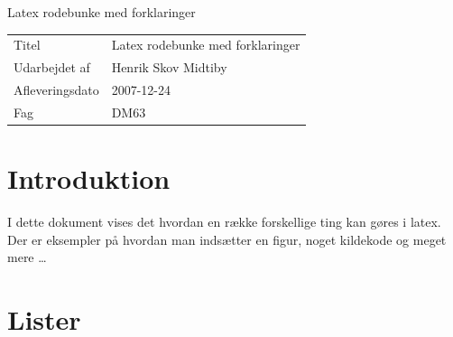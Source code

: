 \documentclass[11pt,a4paper,fleqn]{article}
\title{\titel}
\author{}
\date{}
\numberwithin{equation}{section}
\newcommand{\forfattere}{Henrik Skov Midtiby}
\newcommand{\titel}{Latex rodebunke med forklaringer}
\newcommand{\dato}{2007-12-24}
\newcommand{\fag}{DM63}
\begin{document}
\phantom{g}
\vspace{2.5cm}
\noindent
\begin{Huge}
{\titel}
\end{Huge}
\vspace{11cm}

\begin{tabular}{@{} l l @{}}
\hline
Titel           & \titel                \\
Udarbejdet af   & \forfattere           \\
Afleveringsdato & \dato					\\
Fag      		& \fag					\\
\hline
\end{tabular}
\thispagestyle{empty}
\newpage




\tableofcontents
\listoftodos
\newpage


\section{Introduktion}

I dette dokument vises det hvordan en række forskellige ting kan
gøres i latex. 
%
Der er eksempler på hvordan man indsætter en figur, noget kildekode
og meget mere \ldots



\section{Lister}
\end{document}
